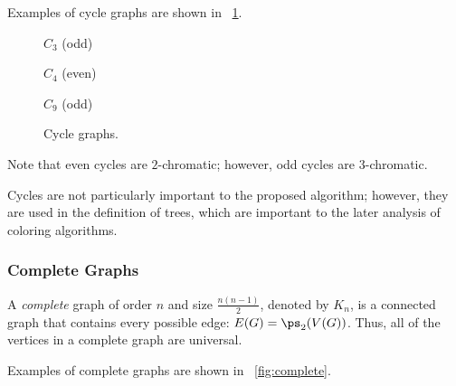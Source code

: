 Examples of cycle graphs are shown in \figurename~\ref{fig:cycle}.

\begin{figure}[H]
  \begin{minipage}{1.75in}
    \centering

    \bigskip

    \(C_3\) (odd)
  \end{minipage}
  \begin{minipage}{1.75in}
    \centering

    \bigskip

    \(C_4\) (even)
  \end{minipage}
  \begin{minipage}{1.75in}
    \centering

    \bigskip

    \(C_9\) (odd)
  \end{minipage}
  \caption{Cycle graphs.}
  \label{fig:cycle}
\end{figure}

Note that even cycles are \(2\)-chromatic; however, odd cycles are \(3\)-chromatic.

Cycles are not particularly important to the proposed algorithm; however, they are used in the definition of trees,
which are important to the later analysis of coloring algorithms.

\subsubsection{Complete Graphs}\label{sec:sub:sub:complete}

A \emph{complete} graph of order \(n\) and size \(\frac{n(n-1)}{2}\), denoted by \(K_n\), is a connected graph that
contains every possible edge: \(E(G)=\ps_2(V(G))\).  Thus, all of the vertices in a complete graph are universal.

Examples of complete graphs are shown in \figurename~\ref{fig:complete}.

